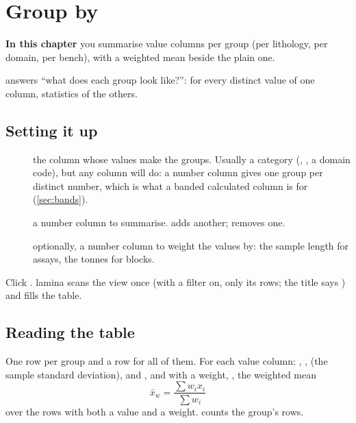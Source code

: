 \chapter{Group by}\label{ch:groupby}
\begin{goals}
\textbf{In this chapter} you summarise value columns per group (per lithology, per domain, per bench),
with a weighted mean beside the plain one.
\end{goals}

 answers ``what does each group look like?'': for every distinct value of one
column, statistics of the others.

\section{Setting it up}\label{sec:groupby-setup}

\begin{description}
\item[] the column whose values make the groups. Usually a category (,
, a domain code), but any column will do: a number column gives one group per distinct number,
which is what a banded calculated column is for (\cref{sec:bands}).
\item[] a number column to summarise.  adds another;  removes one.
\item[] optionally, a number column to weight the values by: the sample length for
assays, the tonnes for blocks.
\end{description}

Click . lamina scans the view once (with a filter on, only its rows; the title says
) and fills the table.


\section{Reading the table}\label{sec:groupby-table}

One row per group and a  row for all of them. For each value column: , ,
 (the sample standard deviation),  and , and with a weight, , the
weighted mean
\[
\bar{x}_w = \frac{\sum w_i x_i}{\sum w_i}
\]
over the rows with both a value and a weight.  counts the group's rows.

